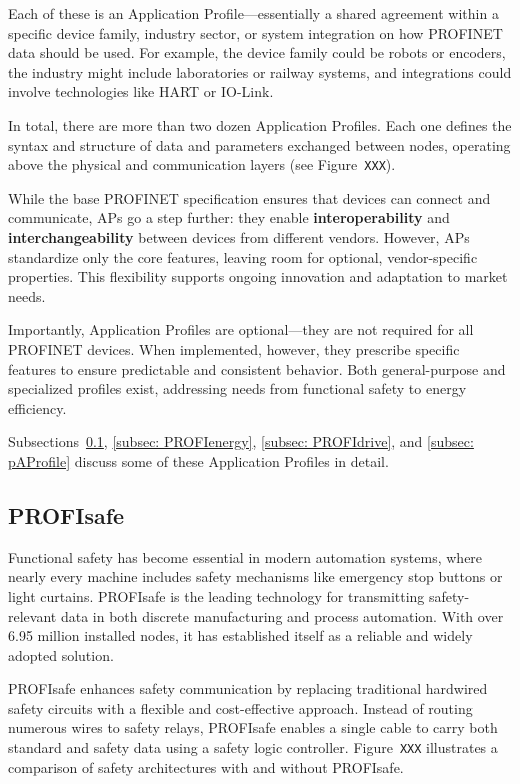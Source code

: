 \documentclass[conference]{IEEEtran}
\begin{document}
Each of these is an Application Profile—essentially a shared agreement within a specific device family, industry sector, or system integration on how PROFINET data should be used. For example, the device family could be robots or encoders, the industry might include laboratories or railway systems, and integrations could involve technologies like HART or IO-Link.

In total, there are more than two dozen Application Profiles. Each one defines the syntax and structure of data and parameters exchanged between nodes, operating above the physical and communication layers (see Figure~\texttt{XXX}).

While the base PROFINET specification ensures that devices can connect and communicate, APs go a step further: they enable \textbf{interoperability} and \textbf{interchangeability} between devices from different vendors. However, APs standardize only the core features, leaving room for optional, vendor-specific properties. This flexibility supports ongoing innovation and adaptation to market needs.

Importantly, Application Profiles are optional—they are not required for all PROFINET devices. When implemented, however, they prescribe specific features to ensure predictable and consistent behavior. Both general-purpose and specialized profiles exist, addressing needs from functional safety to energy efficiency.

Subsections~\ref{subsec:profisafe}, \ref{subsec: PROFIenergy}, \ref{subsec: PROFIdrive}, and \ref{subsec: pAProfile} discuss some of these Application Profiles in detail.


\subsection{PROFIsafe}
\label{subsec:profisafe}

Functional safety has become essential in modern automation systems, where nearly every machine includes safety mechanisms like emergency stop buttons or light curtains. PROFIsafe is the leading technology for transmitting safety-relevant data in both discrete manufacturing and process automation. With over 6.95 million installed nodes, it has established itself as a reliable and widely adopted solution.

PROFIsafe enhances safety communication by replacing traditional hardwired safety circuits with a flexible and cost-effective approach. Instead of routing numerous wires to safety relays, PROFIsafe enables a single cable to carry both standard and safety data using a safety logic controller. Figure~\texttt{XXX} illustrates a comparison of safety architectures with and without PROFIsafe.
\end{document}
